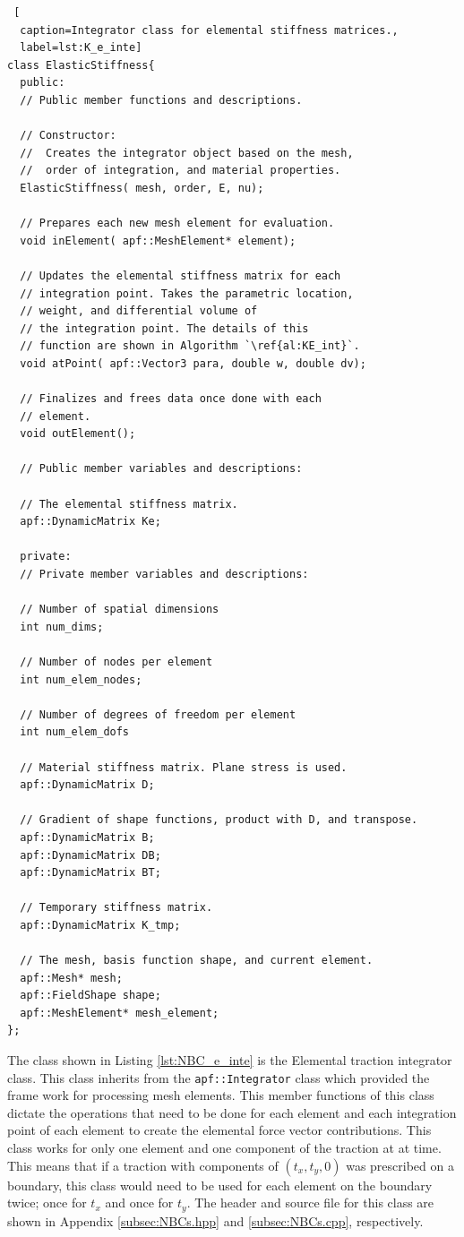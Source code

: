 \documentclass[a4paper, 12pt]{article}
\begin{document}
\begin{lstlisting} [
  caption=Integrator class for elemental stiffness matrices.,
  label=lst:K_e_inte]
class ElasticStiffness{
  public:
  // Public member functions and descriptions.

  // Constructor:
  //  Creates the integrator object based on the mesh,
  //  order of integration, and material properties.
  ElasticStiffness( mesh, order, E, nu);

  // Prepares each new mesh element for evaluation.
  void inElement( apf::MeshElement* element);

  // Updates the elemental stiffness matrix for each
  // integration point. Takes the parametric location,
  // weight, and differential volume of
  // the integration point. The details of this
  // function are shown in Algorithm `\ref{al:KE_int}`.
  void atPoint( apf::Vector3 para, double w, double dv);

  // Finalizes and frees data once done with each
  // element.
  void outElement();

  // Public member variables and descriptions:

  // The elemental stiffness matrix.
  apf::DynamicMatrix Ke;

  private:
  // Private member variables and descriptions:

  // Number of spatial dimensions
  int num_dims;

  // Number of nodes per element
  int num_elem_nodes;

  // Number of degrees of freedom per element
  int num_elem_dofs

  // Material stiffness matrix. Plane stress is used.
  apf::DynamicMatrix D;

  // Gradient of shape functions, product with D, and transpose.
  apf::DynamicMatrix B;
  apf::DynamicMatrix DB;
  apf::DynamicMatrix BT;

  // Temporary stiffness matrix.
  apf::DynamicMatrix K_tmp;

  // The mesh, basis function shape, and current element.
  apf::Mesh* mesh;
  apf::FieldShape shape;
  apf::MeshElement* mesh_element;
};
\end{lstlisting}
\vspace{\baselineskip}

The class shown in Listing
\ref{lst:NBC_e_inte} is the
Elemental traction integrator
class.
This class inherits from the \texttt{apf::Integrator} class
which provided the frame work for processing mesh elements.
This member functions of this class dictate the operations that
need to be done for each element and each integration point
of each element to create the elemental force vector contributions.
This class works for only one element and one component of
the traction at at time. This means that if a traction with
components of $(t_x, t_y, 0)$ was prescribed on a boundary,
this class would need to be used for each element on the boundary
twice; once for $t_x$ and once for $t_y$.
The header and source file for this class are shown in Appendix
\ref{subsec:NBCs.hpp} and
\ref{subsec:NBCs.cpp},
respectively.
\end{document}
